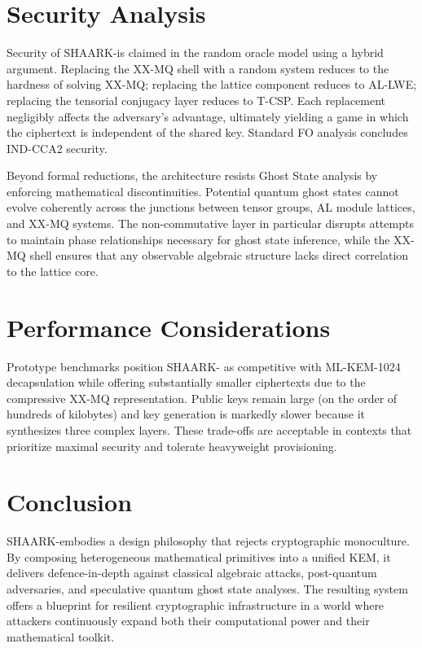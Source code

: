 \documentclass[11pt]{article}
\begin{document}
\section{Security Analysis}
Security of SHAARK-\Xi is claimed in the random oracle model using a hybrid argument. Replacing the XX-MQ shell with a random system reduces to the hardness of solving XX-MQ; replacing the lattice component reduces to AL-LWE; replacing the tensorial conjugacy layer reduces to T-CSP. Each replacement negligibly affects the adversary's advantage, ultimately yielding a game in which the ciphertext is independent of the shared key. Standard FO analysis concludes IND-CCA2 security.

Beyond formal reductions, the architecture resists Ghost State analysis by enforcing mathematical discontinuities. Potential quantum ghost states cannot evolve coherently across the junctions between tensor groups, AL module lattices, and XX-MQ systems. The non-commutative layer in particular disrupts attempts to maintain phase relationships necessary for ghost state inference, while the XX-MQ shell ensures that any observable algebraic structure lacks direct correlation to the lattice core.

\section{Performance Considerations}
Prototype benchmarks position SHAARK- as competitive with ML-KEM-1024 decapsulation while offering substantially smaller ciphertexts due to the compressive XX-MQ representation. Public keys remain large (on the order of hundreds of kilobytes) and key generation is markedly slower because it synthesizes three complex layers. These trade-offs are acceptable in contexts that prioritize maximal security and tolerate heavyweight provisioning.

\section{Conclusion}
SHAARK-\Xi embodies a design philosophy that rejects cryptographic monoculture. By composing heterogeneous mathematical primitives into a unified KEM, it delivers defence-in-depth against classical algebraic attacks, post-quantum adversaries, and speculative quantum ghost state analyses. The resulting system offers a blueprint for resilient cryptographic infrastructure in a world where attackers continuously expand both their computational power and their mathematical toolkit.
\end{document}
